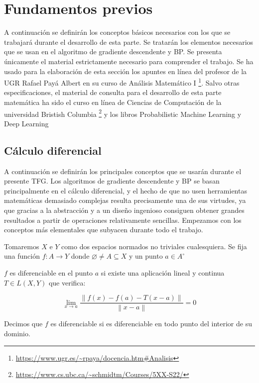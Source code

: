 

\section{Fundamentos previos}
A continuación se definirán los conceptos básicos necesarios con los que se trabajará durante el desarrollo de esta parte. Se tratarán los elementos necesarios que se usan en el algoritmo de gradiente descendente y BP. Se presenta únicamente el material estrictamente necesario para comprender el trabajo. Se ha usado para la elaboración de esta sección los apuntes en línea del profesor de la UGR Rafael Payá Albert en su curso de Análisis Matemático I \footnote{\url{https://www.ugr.es/~rpaya/docencia.htm\#Analisis}}.  Salvo otras especificaciones, el material de consulta para el desarrollo de esta parte matemática ha sido el curso en línea de Ciencias de Computación de la universidad Bristish Columbia \footnote{\url{https://www.cs.ubc.ca/~schmidtm/Courses/5XX-S22/}} y los libros Probabilistic Machine Learning \cite{murphy2022probabilistic} y Deep Learning \cite{GoodFellowBook}


\subsection{Cálculo diferencial}

A continuación se definirán los principales conceptos que se usarán durante el presente TFG. Los algoritmos de gradiente descendente y BP se basan principalmente en el cálculo diferencial, y el hecho de que no usen herramientas matemáticas demasiado complejas resulta precisamente una de sus virtudes, ya que gracias a la abstracción y a un diseño ingenioso consiguen obtener grandes resultados a partir de operaciones relativamente sencillas. Empezamos con los conceptos más elementales que subyacen durante todo el trabajo.

Tomaremos $X$ e $Y$ como dos espacios normados no triviales cualesquiera. Se fija una función $f:A \rightarrow Y$ donde $\varnothing \neq A\subseteq X$ y un punto $a \in A^{\circ}$

\begin{definicion}
    $f$ es diferenciable en el punto $a$ si existe una aplicación lineal y continua $T \in L(X,Y)$ que verifica:

    $$\displaystyle \lim_{x \to a} \frac{\left\| f(x)-f(a)-T(x-a)\right\|}{\left\| x-a\right\|}=0$$
    
    Decimos que $f$ es diferenciable si es diferenciable en todo punto del interior de su dominio.
\end{definicion}


